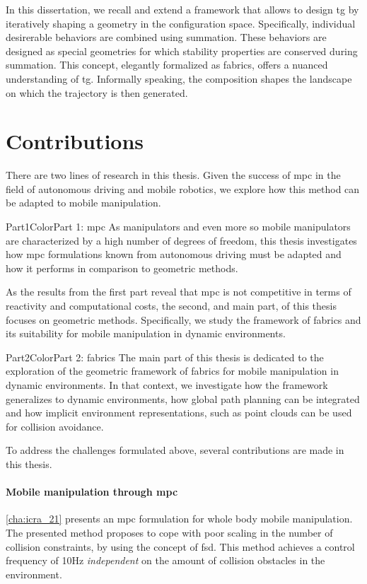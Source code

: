In this dissertation, we recall and extend a framework that
allows to design \ac{tg} by iteratively shaping a geometry
in the configuration space. Specifically, individual
desirerable behaviors are combined using summation. These
behaviors are designed as special geometries for which
stability properties are conserved during summation. This
concept, elegantly formalized as \ac{fabrics}, offers a
nuanced understanding of \ac{tg}. Informally speaking, the
composition shapes the landscape on which the trajectory is
then generated.

\section{Contributions}
\label{sec:contributions}

There are two lines of research in this thesis. Given the
success of \ac{mpc} in the field of autonomous driving and
mobile robotics, we explore how this method can be adapted
to mobile manipulation. 
%
\begin{textbox}{Part1Color}{Part 1: \acl{mpc}}
  As manipulators and even more so mobile manipulators are
  characterized by a high number of degrees of freedom, this
  thesis investigates how \ac{mpc} formulations known from
  autonomous driving must be adapted and how
  it performs in comparison to geometric methods.
\end{textbox}
%

As the results from the first part reveal that \ac{mpc} is 
not competitive in terms of reactivity and computational
costs, the second, and main part, of this thesis focuses on
geometric methods. Specifically, we study the framework
of \acl{fabrics} and its suitability for mobile manipulation
in dynamic environments.
%
\begin{textbox}{Part2Color}{Part 2: \acl{fabrics}}
  The main part of this thesis is dedicated to the
  exploration of the geometric framework of \ac{fabrics} for
  mobile manipulation in dynamic environments. In that
  context, we investigate how the framework generalizes to
  dynamic environments, how global path planning can be
  integrated and how implicit environment representations,
  such as point clouds can be used for collision avoidance.
\end{textbox}

To address the challenges formulated above, several
contributions are made in this thesis.

\paragraph{Mobile manipulation through \ac{mpc}}
\cref{cha:icra_21} presents an \ac{mpc} formulation for
whole body mobile manipulation. The presented method proposes to cope
with poor scaling in the number of collision constraints, by
using the concept of \ac{fsd}. This method achieves a
control frequency of 10Hz \textit{independent} on the amount
of collision obstacles in the environment.

